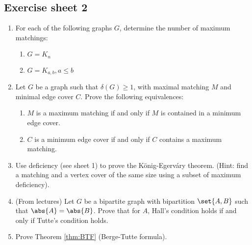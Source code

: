 \subsection*{Exercise sheet 2}
\begin{enumerate}
    \item For each of the following graphs $G$, determine the number of maximum matchings:
    \begin{enumerate}
        \item $G = K_n$
        \item $G = K_{a,b}, a \leq b$
    \end{enumerate}
    
    \item Let $G$ be a graph such that $\delta(G) \geq 1$, with maximal matching $M$ and minimal edge cover $C$. 
    Prove the following equivalences:
    \begin{enumerate}
        \item $M$ is a maximum matching if and only if $M$ is contained in a minimum edge cover.
        \item $C$ is a minimum edge cover if and only if $C$ contains a maximum matching.
    \end{enumerate}
    
    \item Use deficiency (see sheet 1) to prove the König-Egerváry theorem. 
    (Hint: find a matching and a vertex cover of the same size using a subset of maximum deficiency).
    
    \item (From lectures) Let $G$ be a bipartite graph with bipartition $\set{A, B}$ such that $\abs{A} = \abs{B}$. 
    Prove that for $A$, Hall's condition holds if and only if Tutte's condition holds.
    
    \item Prove Theorem \ref{thm:BTF} (Berge-Tutte formula).
\end{enumerate}
